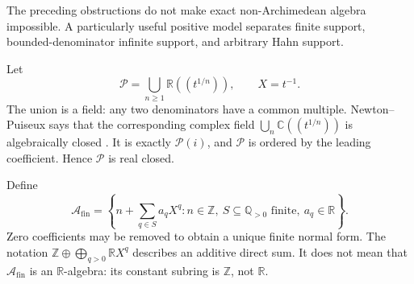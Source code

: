 \documentclass[11pt]{article}
\numberwithin{equation}{section}
\theoremstyle{definition}
\theoremstyle{remark}
\newcommand{\Z}{\mathbb Z}
\newcommand{\Q}{\mathbb Q}
\newcommand{\R}{\mathbb R}
\newcommand{\Pui}{\mathcal P}
\newcommand{\A}{\mathcal A_{\mathrm{fin}}}
\begin{document}
The preceding obstructions do not make exact non-Archimedean algebra
impossible. A particularly useful positive model separates finite support,
bounded-denominator infinite support, and arbitrary Hahn support.

Let
\begin{equation}
\label{pma:bor:eq:Puiseux}
 \Pui=\bigcup_{n\geq1}\R((t^{1/n})),\qquad X=t^{-1}.
\end{equation}
The union is a field: any two denominators have a common multiple.
Newton--Puiseux says that the corresponding complex field
$\bigcup_n\mathbb C((t^{1/n}))$ is algebraically closed
\cite{Puiseux,ParanVo}. It is exactly $\Pui(i)$, and $\Pui$ is ordered by the
leading coefficient. Hence $\Pui$ is real closed.

Define
\begin{equation}
\label{pma:bor:eq:A}
 \A=\left\{n+\sum_{q\in S}a_qX^q:
 n\in\Z,\ S\subseteq\Q_{>0}\text{ finite},\ a_q\in\R\right\}.
\end{equation}
Zero coefficients may be removed to obtain a unique finite normal form.
The notation $\Z\oplus\bigoplus_{q>0}\R X^q$ describes an additive direct
sum. It does not mean that $\A$ is an $\R$-algebra: its constant subring is
$\Z$, not $\R$.
\end{document}
